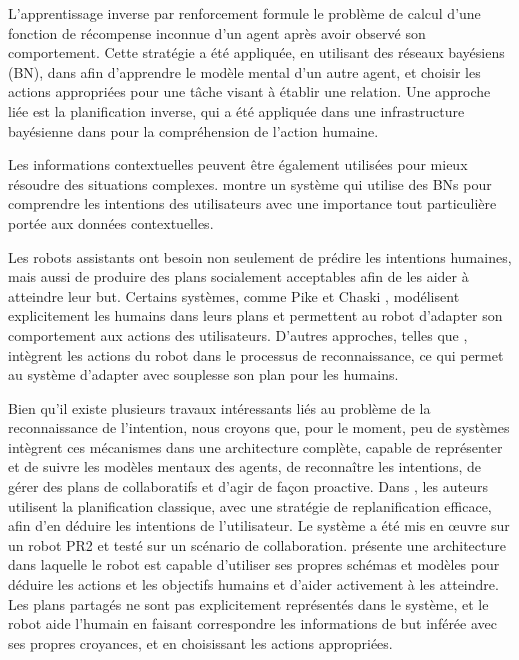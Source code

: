 \documentclass[a4paper,11pt,twoside]{StyleThese}
\begin{document}
L'apprentissage inverse par renforcement \cite{ng2000algorithms} formule le problème de calcul d'une fonction de récompense inconnue d'un agent après avoir observé son comportement. Cette stratégie a été appliquée, en utilisant des réseaux bayésiens (BN), dans \cite{Nagai2015} afin d'apprendre le modèle mental d'un autre agent, et choisir les actions appropriées pour une tâche visant à établir une relation. Une approche liée est la planification inverse, qui a été appliquée dans une infrastructure bayésienne dans \cite{baker2009action} pour la compréhension de l'action humaine.

Les informations contextuelles peuvent être également utilisées pour mieux résoudre des situations complexes. \cite{Liu2014} montre un système qui utilise des BNs pour comprendre les intentions des utilisateurs avec une importance tout particulière portée aux données contextuelles.

Les robots assistants ont besoin non seulement de prédire les intentions humaines, mais aussi de produire des plans socialement acceptables afin de les aider à atteindre leur but. Certains systèmes, comme Pike \cite{karpas2015robust} et Chaski \cite{shah2011improved}, modélisent explicitement les humains dans leurs plans et permettent au robot d'adapter son comportement aux actions des utilisateurs. D'autres approches, telles que \cite{levine2014concurrent}, intègrent les actions du robot dans le processus de reconnaissance, ce qui permet au système d'adapter avec souplesse son plan pour les humains.

Bien qu'il existe plusieurs travaux intéressants liés au problème de la reconnaissance de l'intention, nous croyons que, pour le moment, peu de systèmes intègrent ces mécanismes dans une architecture complète, capable de représenter et de suivre les modèles mentaux des agents, de reconnaître les intentions, de gérer des plans de collaboratifs et d'agir de façon proactive. Dans \cite{talamadupula2014coordination}, les auteurs utilisent la planification classique, avec une stratégie de replanification efficace, afin d'en déduire les intentions de l'utilisateur. Le système a été mis en œuvre sur un robot PR2 et testé sur un scénario de collaboration. \cite{breazeal2009embodied} présente une architecture dans laquelle le robot est capable d'utiliser ses propres schémas et modèles pour déduire les actions et les objectifs humains et d'aider activement à les atteindre. Les plans partagés ne sont pas explicitement représentés dans le système, et le robot aide l'humain en faisant correspondre les informations de but inférée avec ses propres croyances, et en choisissant les actions appropriées.
\end{document}
